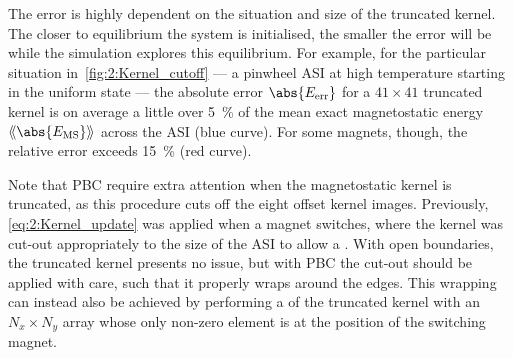 The error is highly dependent on the situation and size of the truncated kernel.
The closer to equilibrium the system is initialised, the smaller the error will be while the simulation explores this equilibrium.
For example, for the particular situation in~\cref{fig:2:Kernel_cutoff} --- a pinwheel ASI at high temperature starting in the uniform state --- the absolute error $\abs{E_\mathrm{err}}$ for a $41 \times 41$ truncated kernel is on average a little over \SI{5}{\percent} of the mean exact magnetostatic energy $\llangle \abs{E_\mathrm{MS}} \rrangle$ across the ASI (blue curve).
For some magnets, though, the relative error exceeds \SI{15}{\percent} (red curve). \par
Note that PBC require extra attention when the magnetostatic kernel is truncated, as this procedure cuts off the eight offset kernel images.
Previously, \cref{eq:2:Kernel_update} was applied when a magnet switches, where the kernel was cut-out appropriately to the size of the ASI to allow a .
With open boundaries, the truncated kernel presents no issue, but with PBC the cut-out should be applied with care, such that it properly wraps around the edges.
This wrapping can instead also be achieved by performing a  of the truncated kernel with an $N_x \times N_y$ array whose only non-zero element is at the position of the switching magnet.

